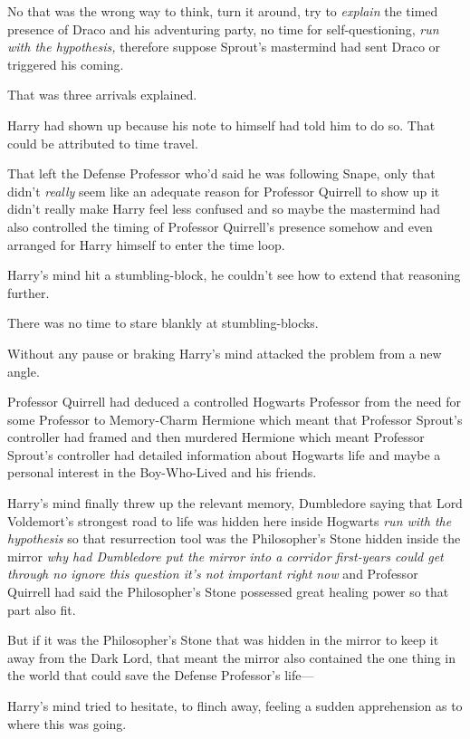 No that was the wrong way to think, turn it around, try to \emph{explain} the
timed presence of Draco and his adventuring party, no time for
self-questioning, \emph{run with the hypothesis,} therefore suppose Sprout's
mastermind had sent Draco or triggered his coming.

That was three arrivals explained.

Harry had shown up because his note to himself had told him to do so. That
could be attributed to time travel.

That left the Defense Professor who'd said he was following Snape, only that
didn't \emph{really} seem like an adequate reason for Professor Quirrell to
show up it didn't really make Harry feel less confused and so maybe the
mastermind had also controlled the timing of Professor Quirrell's presence
somehow and even arranged for Harry himself to enter the time loop.

Harry's mind hit a stumbling-block, he couldn't see how to extend that
reasoning further.

There was no time to stare blankly at stumbling-blocks.

Without any pause or braking Harry's mind attacked the problem from a new angle.

Professor Quirrell had deduced a controlled Hogwarts Professor from the need
for some Professor to Memory-Charm Hermione which meant that Professor Sprout's
controller had framed and then murdered Hermione which meant Professor Sprout's
controller had detailed information about Hogwarts life and maybe a personal
interest in the Boy-Who-Lived and his friends.

Harry's mind finally threw up the relevant memory, Dumbledore saying that Lord
Voldemort's strongest road to life was hidden here inside Hogwarts \emph{run
with the hypothesis} so that resurrection tool was the Philosopher's Stone
hidden inside the mirror \emph{why had Dumbledore put the mirror into a
corridor first-years could get through no ignore this question it's not
important right now} and Professor Quirrell had said the Philosopher's Stone
possessed great healing power so that part also fit.

But if it was the Philosopher's Stone that was hidden in the mirror to keep it
away from the Dark Lord, that meant the mirror also contained the one thing in
the world that could save the Defense Professor's life—

Harry's mind tried to hesitate, to flinch away, feeling a sudden apprehension
as to where this was going.

